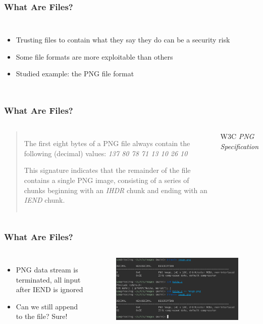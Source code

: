 \documentclass[fleqn]{beamer}
\begin{document}
\begin{frame}
  \frametitle{What Are Files?}
  \begin{columns}[T]
    \column{\textwidth}
    \begin{itemize}
      \item Trusting files to contain what they say they do can be a security risk
      \item Some file formats are more exploitable than others
      \item Studied example: the PNG file format
    \end{itemize}
  \end{columns}
\end{frame}

\begin{frame}
  \frametitle{What Are Files?}
  \begin{columns}[T]
    \column{\textwidth}
    \begin{quote}
    The first eight bytes of a PNG file always contain the following (decimal) values:
    \emph{137 80 78 71 13 10 26 10}

    This signature indicates that the remainder of the file contains a single PNG image, 
    consisting of a series of chunks beginning with an \emph{IHDR} chunk and ending 
    with an \emph{IEND} chunk.
    \end{quote}
    W3C \emph{PNG Specification}
  \end{columns}
\end{frame}

\begin{frame}
  \frametitle{What Are Files?}
  \begin{columns}[T]
    \begin{itemize}
      \item PNG data stream is terminated, all input after IEND is ignored
      \item Can we still append to the file? Sure!
    \end{itemize}
    \begin{figure}[H]
      \centering
      \includegraphics[scale=0.33]{images/hiding_data_after_iend.png}
    \end{figure}
  \end{columns}
\end{frame}
\end{document}
